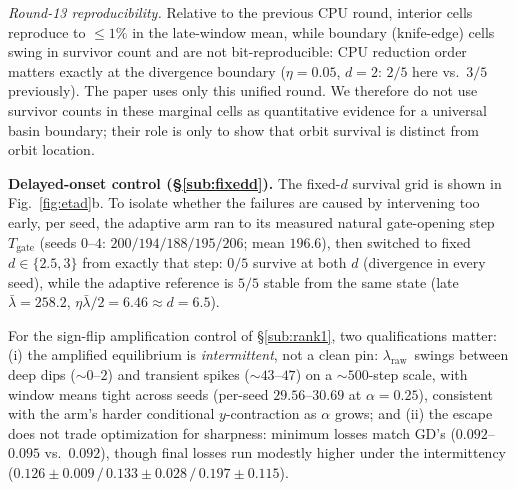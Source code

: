 \documentclass{article}
\theoremstyle{plain}
\theoremstyle{definition}
\theoremstyle{remark}
\newcommand{\lraw}{\ensuremath{\lambda_{\mathrm{raw}}}}
\begin{document}
\emph{Round-13 reproducibility.} Relative to the previous CPU round,
interior cells reproduce to $\le1\%$ in the late-window mean, while
boundary (knife-edge) cells swing in survivor count and are not
bit-reproducible: CPU reduction order matters exactly at the
divergence boundary ($\eta{=}0.05$, $d{=}2$: $2/5$ here vs.\ $3/5$
previously). The paper uses only this unified round. We therefore do
not use survivor counts in these marginal cells as quantitative
evidence for a universal basin boundary; their role is only to show
that orbit survival is distinct from orbit location.

\textbf{Delayed-onset control (\S\ref{sub:fixedd}).} The fixed-$d$
survival grid is shown in Fig.~\ref{fig:etad}b. To isolate whether
the failures are caused by intervening too early, per seed, the
adaptive arm ran to its measured natural gate-opening step
$T_{\mathrm{gate}}$ (seeds $0$--$4$: $200/194/188/195/206$; mean
$196.6$), then switched to fixed $d\in\{2.5,3\}$ from exactly that
step: $0/5$ survive at both $d$ (divergence in every seed), while
the adaptive reference is $5/5$ stable from the same state (late
$\bar\lambda=258.2$, $\eta\bar\lambda/2=6.46\approx d{=}6.5$).

For the sign-flip amplification control of \S\ref{sub:rank1}, two
qualifications matter: (i) the amplified
equilibrium is \emph{intermittent}, not a clean pin: \lraw\ swings
between deep dips (${\sim}0$--$2$) and transient spikes
(${\sim}43$--$47$) on a ${\sim}500$-step scale, with window means tight
across seeds (per-seed $29.56$--$30.69$ at $\alpha{=}0.25$), consistent
with the arm's harder conditional $y$-contraction as $\alpha$ grows; and
(ii) the escape does not trade optimization for sharpness: minimum
losses match GD's ($0.092$--$0.095$ vs.\ $0.092$), though final losses
run modestly higher under the intermittency
($0.126\!\pm\!0.009\,/\,0.133\!\pm\!0.028\,/\,0.197\!\pm\!0.115$).

\FloatBarrier
\end{document}
